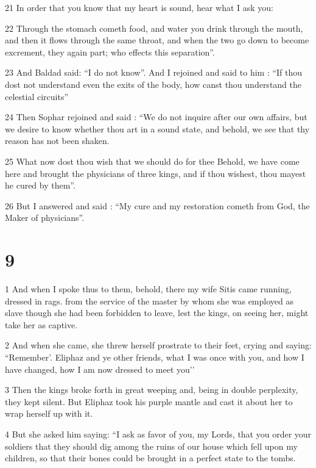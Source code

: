 \par 21 In order that you know that my heart is sound, hear what I ask you:

\par 22 Through the stomach cometh food, and water you drink through the mouth, and then it flows through the same throat, and when the two go down to become excrement, they again part; who effects this separation”.

\par 23 And Baldad said: “I do not know”. And I rejoined and said to him : “If thou dost not understand even the exits of the body, how canst thou understand the celestial circuits”

\par 24 Then Sophar rejoined and said : “We do not inquire after our own affairs, but we desire to know whether thou art in a sound state, and behold, we see that thy reason has not been shaken. 

\par 25 What now dost thou wish that we should do for thee Behold, we have come here and brought the physicians of three kings, and if thou wishest, thou mayest he cured by them”.

\par 26 But I answered and said : “My cure and my restoration cometh from God, the Maker of physicians”.

\chapter{9}

\par 1 And when I spoke thus to them, behold, there my wife Sitis came running, dressed in rags. from the service of the master by whom she was employed as slave though she had been forbidden to leave, lest the kings, on seeing her, might take her as captive.

\par 2 And when she came, she threw herself prostrate to their feet, crying and saying: “Remember’. Eliphaz and ye other friends, what I was once with you, and how I have changed, how I am now dressed to meet you’’

\par 3 Then the kings broke forth in great weeping and, being in double perplexity, they kept silent. But Eliphaz took his purple mantle and cast it about her to wrap herself up with it.

\par 4 But she asked him saying: “I ask as favor of you, my Lords, that you order your soldiers that they should dig among the ruins of our house which fell upon my children, so that their bones could be brought in a perfect state to the tombs.


